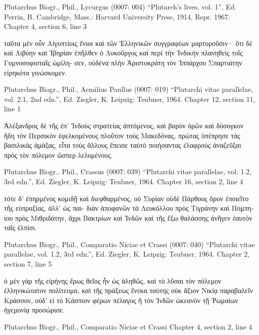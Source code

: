 \documentclass[12pt,letterpaper,twoside,final]{memoir}
\begin{document}
\begin{greek}
Plutarchus Biogr., Phil., Lycurgus (0007: 004)
“Plutarch's lives, vol. 1”, Ed. Perrin, B.
Cambridge, Mass.: Harvard University Press, 1914, Repr. 1967.
Chapter 4, section 6, line 3

                                               ταῦτα 
μὲν οὖν Αἰγυπτίοις ἔνιοι καὶ τῶν Ἑλληνικῶν 
συγγραφέων μαρτυροῦσιν· ὅτι δὲ καὶ Λιβύην καὶ 
Ἰβηρίαν ἐπῆλθεν ὁ Λυκοῦργος καὶ περὶ τὴν 
Ἰνδικὴν πλανηθεὶς τοῖς Γυμνοσοφισταῖς ὡμίλη-
σεν, οὐδένα πλὴν Ἀριστοκράτη τὸν Ἱππάρχου 
Σπαρτιάτην εἰρηκότα γινώσκομεν. 



Plutarchus Biogr., Phil., Aemilius Paullus (0007: 019)
“Plutarchi vitae parallelae, vol. 2.1, 2nd edn.”, Ed. Ziegler, K.
Leipzig: Teubner, 1964.
Chapter 12, section 11, line 1

                                                Ἀλέξανδρος δὲ τῆς ἐπ' Ἰνδοὺς 
στρατείας ἁπτόμενος, καὶ βαρὺν ὁρῶν καὶ δύσογκον ἤδη τὸν Περσικὸν 
ἐφελκομένους πλοῦτον τοὺς Μακεδόνας, πρώτας ὑπέπρησε τὰς βασιλικὰς 
ἁμάξας, εἶτα τοὺς ἄλλους ἔπεισε ταὐτὸ ποιήσαντας ἐλαφροὺς ἀναζεῦξαι 
πρὸς τὸν πόλεμον ὥσπερ λελυμένους. 



Plutarchus Biogr., Phil., Crassus (0007: 039)
“Plutarchi vitae parallelae, vol. 1.2, 3rd edn.”, Ed. Ziegler, K.
Leipzig: Teubner, 1964.
Chapter 16, section 2, line 4

τότε δ' ἐπηρμένος κομιδῇ καὶ διεφθαρμένος, οὐ Συρίαν 
οὐδὲ Πάρθους ὅρον ἐποιεῖτο τῆς εὐπραξίας, ἀλλ' ὡς παι-
διὰν ἀποφανῶν τὰ Λευκόλλου πρὸς Τιγράνην καὶ Πομπηίου 
πρὸς Μιθριδάτην, ἄχρι Βακτρίων καὶ Ἰνδῶν καὶ τῆς ἔξω 
θαλάσσης ἀνῆγεν ἑαυτὸν ταῖς ἐλπίσι. 



Plutarchus Biogr., Phil., Comparatio Niciae et Crassi (0007: 040)
“Plutarchi vitae parallelae, vol. 1.2, 3rd edn.”, Ed. Ziegler, K.
Leipzig: Teubner, 1964.
Chapter 2, section 7, line 5

                                                          ὁ μὲν γὰρ 
τῆς εἰρήνης ἔρως θεῖος ἦν ὡς ἀληθῶς, καὶ τὸ λῦσαι τὸν 
πόλεμον ἑλληνικώτατον πολίτευμα, καὶ τῆς πράξεως 
ἕνεκα ταύτης οὐκ ἄξιον Νικίᾳ παραβαλεῖν Κράσσον, οὐδ' 
εἰ τὸ Κάσπιον φέρων πέλαγος ἢ τὸν Ἰνδῶν ὠκεανὸν τῇ 
Ῥωμαίων ἡγεμονίᾳ προσώρισε. 



Plutarchus Biogr., Phil., Comparatio Niciae et Crassi 
Chapter 4, section 2, line 4


\end{greek}
\end{document}
